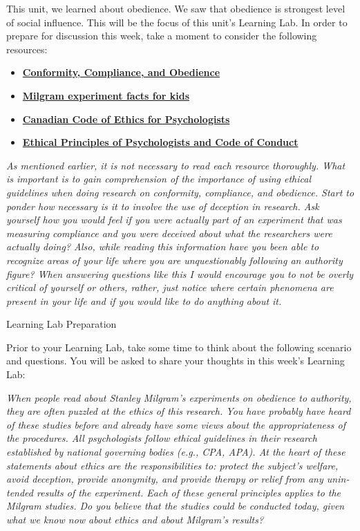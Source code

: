 \documentclass[
]{book}
\providecommand{\tightlist}{%
  \setlength{\itemsep}{0pt}\setlength{\parskip}{0pt}}
\begin{document}
\begin{reflect}
This unit, we learned about obedience. We saw that obedience is strongest level of social influence. This will be the focus of this unit's Learning Lab. In order to prepare for discussion this week, take a moment to consider the following resources:

\begin{itemize}
\tightlist
\item
  \href{https://www.units.miamioh.edu/psybersite/cults/cco.shtml}{\textbf{Conformity, Compliance, and Obedience}}\\
\item
  \href{https://kids.kiddle.co/Milgram_experiment}{\textbf{Milgram experiment facts for kids}}
\item
  \href{https://cpa.ca/docs/File/Ethics/CPA_Code_2017_4thEd.pdf}{\textbf{Canadian Code of Ethics for Psychologists}}\\
\item
  \href{https://www.apa.org/ethics/code/index}{\textbf{Ethical Principles of Psychologists and Code of Conduct}}
\end{itemize}

\emph{As mentioned earlier, it is not necessary to read each resource thoroughly. What is important is to gain comprehension of the importance of using ethical guidelines when doing research on conformity, compliance, and obedience. Start to ponder how necessary is it to involve the use of deception in research. Ask yourself how you would feel if you were actually part of an experiment that was measuring compliance and you were deceived about what the researchers were actually doing? Also, while reading this information have you been able to recognize areas of your life where you are unquestionably following an authority figure? When answering questions like this I would encourage you to not be overly critical of yourself or others, rather, just notice where certain phenomena are present in your life and if you would like to do anything about it.}

{Learning Lab Preparation}

Prior to your Learning Lab, take some time to think about the following scenario and questions. You will be asked to share your thoughts in this week's Learning Lab:

\emph{When people read about Stanley Milgram's experiments on obedience to au­thor­ity, they are often puzzled at the ethics of this research. You have probably have heard of these studies before and already have some views about the ap­propriate­ness of the procedures. All psychologists follow ethical guidelines in their research established by national governing bodies (e.g., CPA, APA). At the heart of these state­ments about ethics are the responsibilities to: protect the subject's welfare, avoid deception, provide anonymity, and provide therapy or relief from any unin­tended results of the experiment. Each of these general principles applies to the Milgram studies. Do you believe that the studies could be conducted today, given what we know now about ethics and about Milgram's results?}


\end{reflect}
\end{document}
